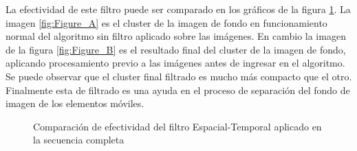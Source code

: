 La efectividad de este filtro puede ser comparado en los gráficos de la figura \ref{fig:result_spatio_temporal_filter}. La imagen \ref{fig:Figure_A} es el cluster de la imagen de fondo en funcionamiento normal del algoritmo sin filtro aplicado sobre las imágenes. En cambio la imagen de la figura \ref{fig:Figure_B} es el resultado final del cluster de la imagen de fondo,  aplicando procesamiento previo a las imágenes antes de ingresar en el algoritmo. Se puede observar que el cluster final filtrado es mucho más compacto que el otro. Finalmente esta de filtrado es una ayuda en el proceso de separación del fondo de imagen de los elementos móviles.

\begin{figure}
\centering     %
{}
\caption[Comparación de efectividad del filtro en una secuencia completa]{Comparación de efectividad del filtro Espacial-Temporal aplicado en la secuencia completa }
\label{fig:result_spatio_temporal_filter}
\end{figure}



